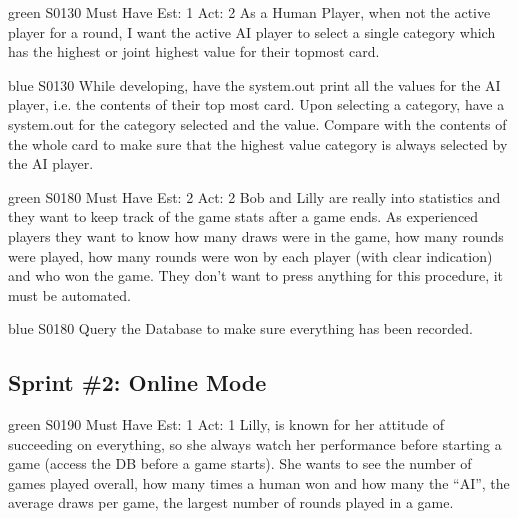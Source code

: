 
\newpage

\begin{card}{green}
{S0130}
{Must Have}
{Est: 1}
{Act: 2}
As a Human Player, when not the active player for a round, I want the active AI player to select a single category which has the highest or joint highest value for their topmost card.
\end{card}

\begin{card}{blue}
{S0130}{}{}{}
While developing, have the system.out print all the values for the AI player, i.e. the contents of their top most card. 
Upon selecting a category, have a system.out for the category selected and the value. 
Compare with the contents of the whole card to make sure that the highest value category is always selected by the AI player.
\end{card}


\newpage

\begin{card}{green}
{S0180}
{Must Have}
{Est: 2}
{Act: 2}
Bob and Lilly are really into statistics and they want to keep track of the game stats after a game ends. 
As experienced players they want to know how many draws were in the game, how many rounds were played, how many rounds were won by each player (with clear indication) and who won the game. 
They don't want to press anything for this procedure, it must be automated.
\end{card}

\begin{card}{blue}
{S0180}{}{}{}
Query the Database to make sure everything has been recorded.
\end{card}


\newpage
\subsection{Sprint \#2: Online Mode}
\label{appendix:user_stories_online}
\bigskip

\begin{card}{green}
{S0190}
{Must Have}
{Est: 1}
{Act: 1}
Lilly, is known for her attitude of succeeding on everything, so she always watch her performance before starting a game (access the DB before a game starts). 
She wants to see the number of games played overall, how many times a human won and how many the ``AI'', the average draws per game, the largest number of rounds played in a game.
\end{card}

